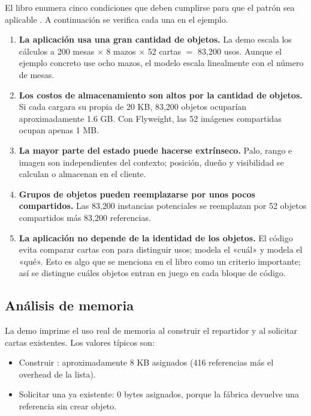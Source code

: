 \documentclass{article}
\begin{document}
El libro enumera cinco condiciones que deben cumplirse para que el patrón sea aplicable \cite[p.~197]{gamma1994design}. A continuación se verifica cada una en el ejemplo.

\begin{enumerate}
    \item \textbf{La aplicación usa una gran cantidad de objetos.} La demo escala los cálculos a 200 mesas $\times$ 8 mazos $\times$ 52 cartas $=$ 83{,}200 usos. Aunque el ejemplo concreto use ocho mazos, el modelo escala linealmente con el número de mesas.

    \item \textbf{Los costos de almacenamiento son altos por la cantidad de objetos.} Si cada  cargara su propia  de 20 KB, 83{,}200 objetos ocuparían aproximadamente 1.6 GB. Con Flyweight, las 52 imágenes compartidas ocupan apenas 1 MB.

    \item \textbf{La mayor parte del estado puede hacerse extrínseco.} Palo, rango e imagen son independientes del contexto; posición, dueño y visibilidad se calculan o almacenan en el cliente.

    \item \textbf{Grupos de objetos pueden reemplazarse por unos pocos compartidos.} Las 83{,}200 instancias potenciales se reemplazan por 52 objetos compartidos más 83{,}200 referencias.

    \item \textbf{La aplicación no depende de la identidad de los objetos.} El código evita comparar cartas con \codigo{==} para distinguir usos;  modela el «cuál» y  modela el «qué». Esto es algo que se menciona en el libro como un criterio importante; así se distingue cuáles objetos entran en juego en cada bloque de código.
\end{enumerate}
\subsection{Análisis de memoria}

La demo imprime el uso real de memoria al construir el repartidor y al solicitar cartas existentes. Los valores típicos son:

\begin{itemize}
    \item Construir : aproximadamente 8 KB asignados (416 referencias más el overhead de la lista).
    \item Solicitar una  ya existente: 0 bytes asignados, porque la fábrica devuelve una referencia sin crear objeto.
\end{itemize}
\end{document}
